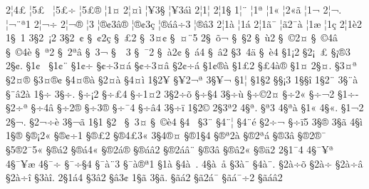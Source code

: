 {2^^a64^^a3
^^a65^^a3^^a0
^^a65^^a3^^f7
^^a65^^a3^^ae
^^a61^^a4
2^^a6^^a4^^ec
^^a6^^a53^^a7
^^a6^^a53^^e1^^ec
2^^a61^^a6
2^^a61^^a7
1^^a6^^a8
^^a61^^aa
^^a61^^ab
^^a62^^ab^^e3
^^a61^^ac
2^^a6^^ac.
^^a6^^ac^^a8^^aa1
2^^a6^^ac^^f7
2^^a6^^ac^^ae
^^a63^^ad
^^a6^^ae^^a23^^e2^^ae
^^a6^^ae^^a23^^e7
^^a6^^ae^^e1^^e2^^f73
^^a6^^ae^^e23
2^^a61^^e0
^^a61^^e1
2^^a61^^e3^^af
^^a6^^e32^^af^^e0
^^a61^^e6
^^a61^^e7
2^^a61^^e82
1^^a7^^a01
3^^a72^^a0^^a12
3^^a72^^a0^^a2
^^a7^^a0^^a22^^e7
^^a7^^a0^^a32
^^a7^^a03^^a4^^a2
^^a7^^a0^^a4^^a85
2^^a7^^a0^^f5^^ac
^^a7^^a0^^a72
^^a7^^a0^^f92
^^a7^^a0^^a92^^a4
^^a7^^a0^^a94^^e2
^^a7^^a0^^a94^^e8
^^a7^^a0^^aa2
^^a7^^a02^^aa^^e2
^^a7^^a03^^ac
^^a7^^a0^^ad^^a03
^^a7^^a0^^af2
^^a7^^a0^^e02^^a2
^^a7^^a0^^e14
^^a7^^a0^^e22
^^a73^^a04^^e4
^^a7^^a0^^e84
^^a71^^a12
^^a72^^a1^^a0^^a3
^^a7^^a1^^ae3
2^^a7^^a2.
^^a71^^a2^^a0
^^a71^^a2^^a8
^^a71^^a2^^f7
^^a7^^a2^^f73^^a4^^e1
^^a7^^a2^^f73^^a4^^e2
^^a72^^a2^^f7^^e1
^^a71^^a2^^ae^^e0
^^a71^^a32
^^a7^^a34^^e0^^ae
^^a71^^a4
2^^a7^^a4.
^^a73^^a4^^aa
^^a72^^a4^^ae
^^a73^^a4^^ae^^a2
^^a74^^a4^^ae^^e0
^^a72^^a4^^e0
^^a74^^a4^^ec
1^^a72^^a5
^^a7^^a52^^ac^^aa
3^^a7^^a5^^ac^^ad
^^a71^^a6
^^a71^^a72
^^a7^^a7^^a13
1^^a7^^a7^^ee
1^^a72^^a8
3^^a7^^a8^^e0
^^a7^^a8^^e22^^e0
1^^a7^^f7
3^^a7^^f7.
^^a7^^f7^^a12
^^a7^^f7^^a34
^^a7^^f71^^a42
3^^a72^^f7^^f5
^^a7^^f7^^a74
3^^a7^^f7^^f9
^^a7^^f7^^a92^^a4
^^a7^^f72^^ab
^^a7^^f7^^ac2
^^a71^^f7^^ad
^^a72^^f7^^ad^^aa
^^a7^^f74^^ad^^e2
^^a7^^f72^^ae
^^a7^^f73^^ae^^ad^^ad
^^a7^^f7^^af4
^^a7^^f7^^e24
3^^a7^^f7^^ef
1^^a72^^a9
2^^a73^^aa2
4^^a7^^aa.
^^a7^^aa3^^ad
4^^a7^^aa^^e0
^^a71^^ab
4^^a7^^ab.
^^a71^^ac2
2^^a7^^ac.
^^a72^^ac^^f7^^e8
3^^a7^^ac^^e3
1^^a71^^ad
^^a72^^ad^^a0
^^a7^^ad^^a03^^a4
^^a7^^ad^^a0^^a9^^e84
^^a74^^ad^^a0^^ad
^^a73^^ad^^a8
^^a74^^ad^^a8^^a6
^^a74^^ad^^a8^^e9
^^a72^^ad^^f7^^ac
^^a7^^ad^^f7^^ef5
3^^a7^^ad^^ae
3^^a7^^ad^^e3
4^^a7^^ad^^ec
1^^a7^^ae
^^a7^^ae^^a12^^ab
^^a7^^ae^^a2^^f71
^^a7^^ae^^a32
^^a7^^ae4^^a33^^ab
3^^a74^^ae^^a4
^^a7^^ae1^^a74
^^a7^^ae^^aa2^^e0
^^a7^^ae2^^aa^^e1
^^a7^^ae3^^ad^^e2
^^a7^^ae2^^ae^^af
^^a75^^ae2^^af5^^ab
^^a7^^ae^^e12
^^a7^^ae^^e14^^ab
^^a7^^ae2^^e1^^ae
^^a7^^ae^^e1^^e22
^^a7^^ae2^^e1^^e2^^a8
^^a7^^ae3^^e2
^^a7^^ae^^e22^^ab
^^a7^^ae^^e42
2^^a71^^af4
4^^a7^^af^^a5^^aa
4^^a7^^af^^a5^^e6
4^^a7^^af^^f7
^^a7^^af^^f7^^a74
^^a7^^af^^e0^^a83
^^a7^^af^^e0^^ae^^aa1
^^a71^^e0
^^a74^^e0^^a0.
4^^a7^^e0^^a0^^e5
^^a73^^e0^^a8
^^a74^^e0^^a8.
^^a72^^e0^^f7^^f5
^^a72^^e0^^f7^^ad
^^a72^^e0^^f7^^e2
^^a72^^e0^^f7^^ee
^^a73^^e0^^ee.
2^^a71^^e14
^^a73^^e22
^^a7^^e23^^a2
1^^a7^^e3
3^^a7^^e3.
^^a7^^e3^^e12
^^a7^^e32^^e1^^af
^^a7^^e3^^e1^^af^^f72
^^a7^^e3^^e1^^e22
}
